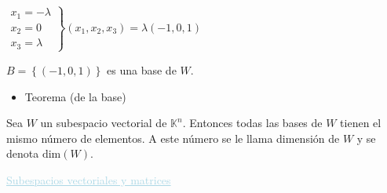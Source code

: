 \documentclass[12pt]{article}
\begin{document}
$\left.\begin{array}{r}
x_1=-\lambda\\
x_2=0\\
x_3=\lambda
\end{array}\right\rbrace(x_1,x_2,x_3)=\lambda(-1,0,1)$

$B=\left\lbrace(-1,0,1)\right\rbrace$ es una base de $W$.
\begin{itemize}[label=\color{red}\textbullet, leftmargin=*]
    \item \color{lightblue} Teorema (de la base)
\end{itemize}
Sea $W$ un subespacio vectorial de $\mathbb{K}^n$. Entonces todas las bases de $W$ tienen el mismo número de elementos. A este número se le llama dimensión de $W$ y se denota $\mathrm{dim}(W)$.

\textcolor{lightblue}{\underline{Subespacios vectoriales y matrices}}
\end{document}
